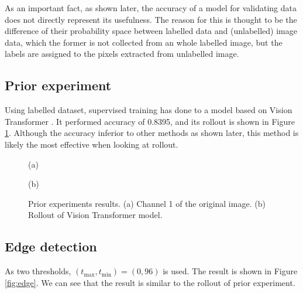 \documentclass{article}
\begin{document}
        As an important fact, as shown later,
        the accuracy of a model for validating data does not
        directly represent its usefulness.
        The reason for this is thought to be the difference of their
        probability space between labelled data and (unlabelled) image data,
        which the former is not collected from an whole labelled image,
        but the labels are assigned to the pixels extracted from unlabelled image.

    \subsection{Prior experiment} \label{sec:vit}
        Using labelled dataset,
        supervised training has done to a model based on Vision Transformer \cite{vit}.
        It performed accuracy of 0.8395, and its rollout is shown in Figure \ref{fig:vit}.
        Although the accuracy inferior to other methods as shown later,
        this method is likely the most effective when looking at rollout.

        \begin{figure}[ht]
            \centering
            \begin{minipage}{0.49\hsize}
                \centering
                \caption*{(a)}
            \end{minipage}
            \begin{minipage}{0.49\hsize}
                \centering
                \caption*{(b)}
            \end{minipage}
            \caption{
                Prior experiments results.
                (a) Channel 1 of the original image.
                (b) Rollout of Vision Transformer model.
            }
            \label{fig:vit}
        \end{figure}

    \subsection{Edge detection} \label{sec:edge}
        As two thresholds, $(t_\mathrm{max}, t_\mathrm{min}) = (0, 96)$ is used.
        The result is shown in Figure \ref{fig:edge}.
        We can see that the result is similar to the rollout of prior experiment.
\end{document}
